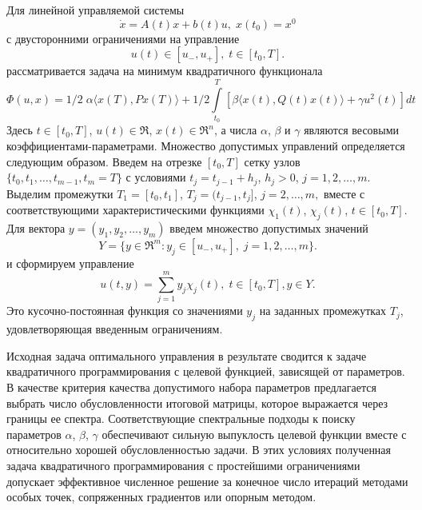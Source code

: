 Для линейной управляемой системы
\begin{equation*}
\dot x=A(t)x + b(t)u, \; x(t_0)=x^0
\end{equation*}
с двусторонними ограничениями на управление
\begin{equation*}
u(t) \in [u_{-}, u_{+}], \; t \in [t_0, T].
\end{equation*}
рассматривается задача на минимум квадратичного функционала
\begin{equation*}
\Phi(u, x)= 1/2 \; \alpha \langle x(T), Px(T)\rangle + 1/2  \int\limits_{t_0}^{T}
	{[\beta \langle x(t), Q(t)x(t) \rangle + \gamma u^2(t)] dt}
\end{equation*}
Здесь $t \in [t_0, T]$, $u(t) \in \Re$, $x(t) \in \Re^n$, а числа  $\alpha$, $\beta$ и $\gamma$ являются весовыми коэффициентами-параметрами. Множество допустимых управлений определяется следующим образом. Введем на отрезке $[t_0, T]$ сетку узлов $\{{t_0, t_1, \ldots , t_{m-1}, t_m = T}\}$ с условиями $t_j = t_{j-1} + h_j$, $h_j > 0$, $j = 1, 2, \ldots , m$. Выделим промежутки $T_1=[t_0, t_1]$, $T_j = (t_{j-1}, t_j]$, $j = 2, \ldots , m,$ вместе с соответствующими характеристическими функциями $\chi_1(t)$, $\chi_j(t)$, $t \in [t_0, T]$.
Для вектора $y=(y_1, y_2, \ldots ,y_m)$ введем множество допустимых значений
\begin{equation*}
Y = \{ y \in \Re^m: y_j \in [u_{-}, u_{+}], \; j = 1, 2, \ldots , m \}.
\end{equation*}
и сформируем управление
\begin{equation*}
u(t,y) =  \sum_{j=1}^{m} y_j \chi_j(t), \; t \in [t_0, T], y \in Y.
\end{equation*}
Это кусочно-постоянная функция со значениями $y_j$ на заданных промежутках $T_j$, удовлетворяющая введенным ограничениям.

Исходная задача оптимального управления в результате сводится к задаче квадратичного программирования с целевой функцией, зависящей от параметров. В качестве критерия качества допустимого набора параметров предлагается выбрать число обусловленности итоговой матрицы, которое выражается через границы ее спектра. Соответствующие спектральные подходы к  поиску параметров $\alpha$, $\beta$, $\gamma$ обеспечивают сильную выпуклость целевой функции вместе с относительно хорошей обусловленностью задачи. В этих условиях полученная задача квадратичного программирования с простейшими ограничениями допускает эффективное численное решение за конечное число итераций методами особых точек, сопряженных градиентов или опорным методом.

